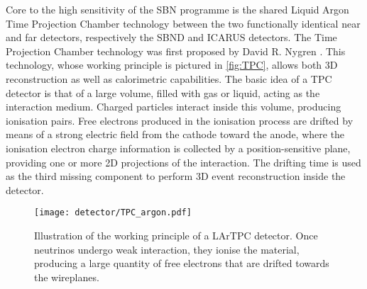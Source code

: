 Core to the high sensitivity of the SBN programme is the shared Liquid Argon Time Projection Chamber technology between the two functionally identical near and far detectors, respectively the SBND and ICARUS detectors. The Time Projection Chamber technology was first proposed by David R. Nygren \cite{Marx:1978zz}. This technology, whose working principle is pictured in \autoref{fig:TPC}, allows both 3D reconstruction as well as calorimetric capabilities. The basic idea of a TPC detector is that of a large volume, filled with gas or liquid, acting as the interaction medium. Charged particles interact inside this volume, producing ionisation pairs. Free electrons produced in the ionisation process are drifted by means of a strong electric field from the cathode toward the anode, where the ionisation electron charge information is collected by a position-sensitive plane, providing one or more 2D projections of the interaction. The drifting time is used as the third missing component to perform 3D event reconstruction inside the detector. 

\begin{figure}
    \centering
    \texttt{[image: detector/TPC\_argon.pdf]}
    \caption[LArTPC illustration]{Illustration of the working principle of a LArTPC detector. Once neutrinos undergo weak interaction, they ionise the material, producing a large quantity of free electrons that are drifted towards the wireplanes. }
    \label{fig:TPC}
\end{figure}

